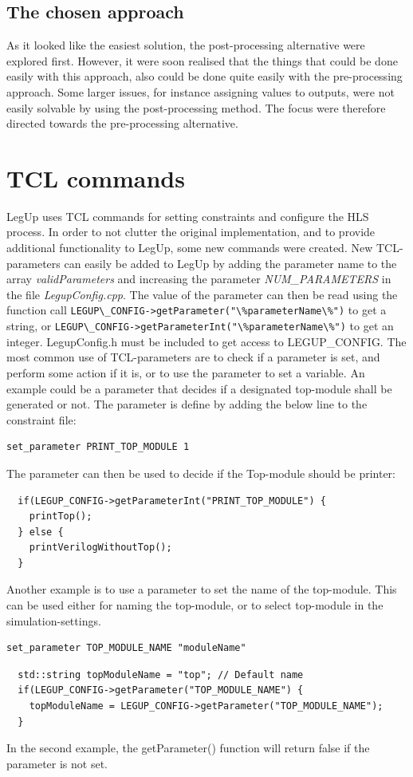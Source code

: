 \subsection{The chosen approach}
As it looked like the easiest solution, the post-processing alternative were explored first. However, it were soon realised that the things that could be done easily with this approach, also could be done quite easily with the pre-processing approach. Some larger issues, for instance assigning values to outputs, were not easily solvable by using the post-processing method. The focus were therefore directed towards the pre-processing alternative.

\section{TCL commands}
LegUp uses TCL commands for setting constraints and configure the HLS process. In order to not clutter the original implementation, and to provide additional functionality to LegUp, some new commands were created. New TCL-parameters can easily be added to LegUp by adding the parameter name to the array \textit{validParameters} and increasing the parameter \textit{NUM\_PARAMETERS} in the file \textit{LegupConfig.cpp}. The value of the parameter can then be read using the function call \verb!LEGUP\_CONFIG->getParameter("\%parameterName\%")! to get a string, or \verb!LEGUP\_CONFIG->getParameterInt("\%parameterName\%")! to get an integer. LegupConfig.h must be included to get access to LEGUP\_CONFIG. The most common use of TCL-parameters are to check if a parameter is set, and perform some action if it is, or to use the parameter to set a variable. An example could be a parameter that decides if a designated top-module shall be generated or not. The parameter is define by adding the below line to the constraint file:

\begin{verbatim}
set_parameter PRINT_TOP_MODULE 1
\end{verbatim}
The parameter can then be used to decide if the Top-module should be printer:
\lstset{language=C++,style=Cstyle}
\begin{lstlisting}
  if(LEGUP_CONFIG->getParameterInt("PRINT_TOP_MODULE") {
    printTop();
  } else {
    printVerilogWithoutTop();
  }
\end{lstlisting}

Another example is to use a parameter to set the name of the top-module. This can be used either for naming the top-module, or to select top-module in the simulation-settings. 
\begin{verbatim}
set_parameter TOP_MODULE_NAME "moduleName"
\end{verbatim}
\begin{lstlisting}
  std::string topModuleName = "top"; // Default name
  if(LEGUP_CONFIG->getParameter("TOP_MODULE_NAME") {
    topModuleName = LEGUP_CONFIG->getParameter("TOP_MODULE_NAME");
  }
\end{lstlisting}
In the second example, the getParameter() function will return false if the parameter is not set.

